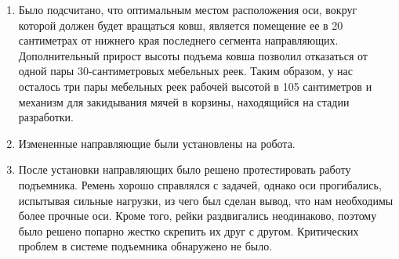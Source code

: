 \begin{enumerate}
\begin{enumerate}
      \item  Было подсчитано, что оптимальным местом расположения оси, вокруг которой должен будет вращаться ковш, является помещение ее в 20 сантиметрах от нижнего края последнего сегмента направляющих. Дополнительный прирост высоты подъема ковша позволил отказаться от одной пары 30-сантиметровых мебельных реек. Таким образом, у нас осталось три пары мебельных реек рабочей высотой в 105 сантиметров и механизм для закидывания мячей в корзины, находящийся на стадии разработки.\newline
      
      \item  Измененные направляющие были установлены на робота.\newline
      
      \item  После установки направляющих было решено протестировать работу подъемника. Ремень хорошо справлялся с задачей, однако оси прогибались, испытывая сильные нагрузки, из чего был сделан вывод, что нам необходимы более прочные оси. Кроме того, рейки раздвигались неодинаково, поэтому было решено попарно жестко скрепить  их друг с другом. Критических проблем в системе подъемника обнаружено не было.\newline
      

\end{enumerate}
\end{enumerate}
